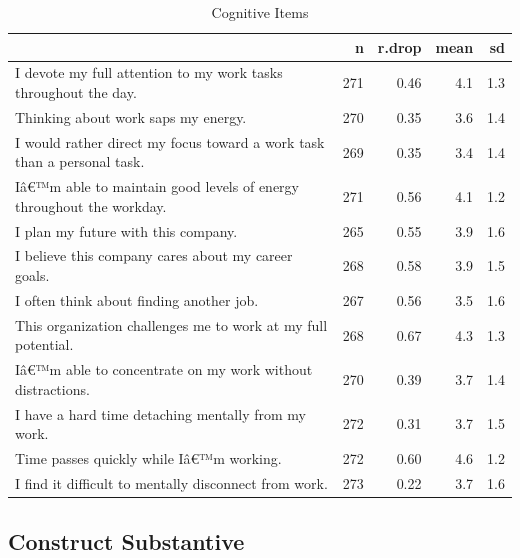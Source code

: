 \documentclass[
]{book}
\begin{document}
\begin{table}

\caption{\label{tab:rdrop3}Cognitive Items}
\centering
\begin{tabular}[t]{l|r|r|r|r}
\hline
  & n & r.drop & mean & sd\\
\hline
I devote my full attention to my work tasks throughout the day. & 271 & 0.46 & 4.1 & 1.3\\
\hline
Thinking about work saps my energy. & 270 & 0.35 & 3.6 & 1.4\\
\hline
I would rather direct my focus toward a work task than a personal task. & 269 & 0.35 & 3.4 & 1.4\\
\hline
Iâ€™m able to maintain good levels of energy throughout the workday. & 271 & 0.56 & 4.1 & 1.2\\
\hline
I plan my future with this company. & 265 & 0.55 & 3.9 & 1.6\\
\hline
I believe this company cares about my career goals. & 268 & 0.58 & 3.9 & 1.5\\
\hline
I often think about finding another job. & 267 & 0.56 & 3.5 & 1.6\\
\hline
This organization challenges me to work at my full potential. & 268 & 0.67 & 4.3 & 1.3\\
\hline
Iâ€™m able to concentrate on my work without distractions. & 270 & 0.39 & 3.7 & 1.4\\
\hline
I have a hard time detaching mentally from my work. & 272 & 0.31 & 3.7 & 1.5\\
\hline
Time passes quickly while Iâ€™m working. & 272 & 0.60 & 4.6 & 1.2\\
\hline
I find it difficult to mentally disconnect from work. & 273 & 0.22 & 3.7 & 1.6\\
\hline
\end{tabular}
\end{table}

\hypertarget{construct-substantive}{%
\subsection{Construct Substantive}\label{construct-substantive}}
\end{document}
